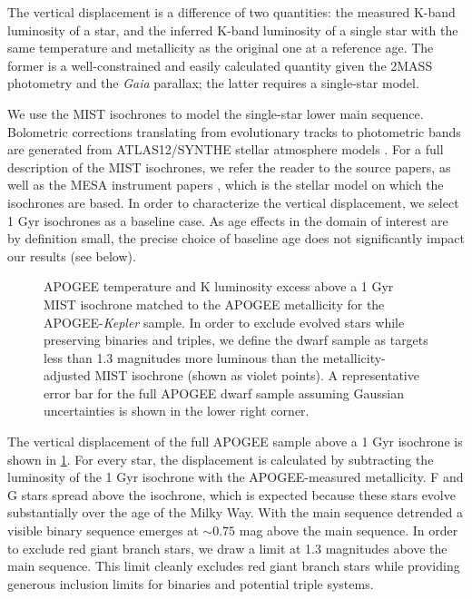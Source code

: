 \documentclass[manuscript]{aastex6}
\newcommand{\Kepler}{\mbox{\textit{Kepler}}}
\newcommand{\Gaia}{\mbox{\textit{Gaia}}}
\begin{document}
The vertical displacement is a difference of two quantities: the measured 
K-band luminosity of a star, and the inferred K-band luminosity of a single 
star with the same temperature and metallicity as the original one at a reference age. The 
former is a well-constrained and easily calculated quantity given the 2MASS 
photometry and the \Gaia{} parallax; the latter requires a single-star model.

We use the MIST \citep{Dotter16,Choi16} isochrones to model the 
single-star lower main sequence. Bolometric corrections translating from
evolutionary tracks to photometric bands are generated from ATLAS12/SYNTHE
stellar atmosphere models \citep{Kurucz70,Kurucz93}. For a full description of the MIST isochrones, we 
refer the reader to the source papers, as well as the MESA instrument papers 
\citep{Paxton11, Paxton13, Paxton15}, which is the stellar model on which the 
isochrones are based. In order to characterize the vertical displacement, we select 1 Gyr isochrones
as a baseline case. As age effects in the domain of interest are by definition
small, the precise choice of baseline age does not significantly impact our 
results (see below).

\begin{figure}[htb]
    \centering
    \caption{APOGEE temperature and K luminosity excess above a 1 Gyr MIST isochrone 
        matched to the APOGEE metallicity for the APOGEE-\Kepler{} sample. 
        In order to exclude evolved stars while preserving binaries and
        triples, we define the dwarf sample as targets less than 1.3 magnitudes
        more luminous than the metallicity-adjusted MIST isochrone (shown as
        violet points). A representative error bar for the 
        full APOGEE dwarf sample assuming Gaussian uncertainties is shown in 
        the lower right corner.}\label{fig:sample_dk}
\end{figure}


The vertical displacement of the full APOGEE sample above a 1 Gyr isochrone is 
shown in \cref{fig:sample_dk}. For every star, the displacement is calculated 
by subtracting the luminosity of the 1 Gyr isochrone with the APOGEE-measured 
metallicity. F and G stars spread above the isochrone, which is 
expected because these stars evolve substantially over the age of the Milky
Way. With the main sequence detrended a visible binary sequence emerges at 
\(\sim0.75\) mag above the main sequence. In order to exclude red 
giant branch stars, we draw a limit at 1.3 magnitudes above the main sequence. 
This limit cleanly excludes red giant branch stars while providing generous 
inclusion limits for binaries and potential triple systems.
\end{document}
